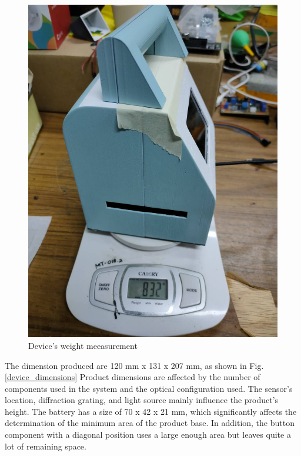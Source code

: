 \documentclass[conference]{IEEEtran}
\begin{document}
\begin{figure}[htbp]
    \centerline{\includegraphics[angle=90,scale=0.12]{SCTP_weight.jpg}}
    \caption{Device's weight meeasurement}
    \label{device_weight}
    \end{figure}

The dimension produced are 120 mm x 131 x 207 mm, as shown in Fig. \ref{device_dimensions}
Product dimensions are affected by the number of components used in the system and the optical configuration used. 
The sensor's location, diffraction grating, and light source mainly influence the product's height. 
The battery has a size of 70 x 42 x 21 mm, which significantly affects the determination of the minimum area of ​​the product base. 
In addition, the button component with a diagonal position uses a large enough area but leaves quite a lot of remaining space.
\end{document}
